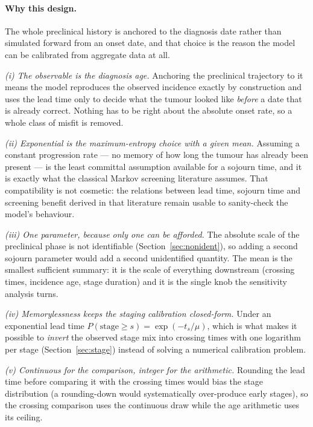 \documentclass[12pt,a4paper]{article}
\newcommand{\why}[1]{\paragraph{Why this design.} #1}
\begin{document}
\why{The whole preclinical history is anchored to the diagnosis date rather than simulated forward from an
onset date, and that choice is the reason the model can be calibrated from aggregate data at all.

\emph{(i) The observable is the diagnosis age.} Anchoring the preclinical trajectory to it means the model
reproduces the observed incidence exactly by construction and uses the lead time only to decide what the
tumour looked like \emph{before} a date that is already correct. Nothing has to be right about the absolute
onset rate, so a whole class of misfit is removed.

\emph{(ii) Exponential is the maximum-entropy choice with a given mean.} Assuming a constant progression
rate --- no memory of how long the tumour has already been present --- is the least committal assumption
available for a sojourn time, and it is exactly what the classical Markov screening literature assumes.
That compatibility is not cosmetic: the relations between lead time, sojourn time and screening benefit
derived in that literature remain usable to sanity-check the model's behaviour.

\emph{(iii) One parameter, because only one can be afforded.} The absolute scale of the preclinical phase
is not identifiable (Section~\ref{sec:nonident}), so adding a second sojourn parameter would add a second
unidentified quantity. The mean is the smallest sufficient summary: it is the scale of everything
downstream (crossing times, incidence age, stage duration) and it is the single knob the sensitivity
analysis turns.

\emph{(iv) Memorylessness keeps the staging calibration closed-form.} Under an exponential lead time
$P(\text{stage} \ge s) = \exp(-t_s/\mu)$, which is what makes it possible to \emph{invert} the observed
stage mix into crossing times with one logarithm per stage (Section~\ref{sec:stage}) instead of solving a
numerical calibration problem.

\emph{(v) Continuous for the comparison, integer for the arithmetic.} Rounding the lead time before
comparing it with the crossing times would bias the stage distribution (a rounding-down would
systematically over-produce early stages), so the crossing comparison uses the continuous draw while the
age arithmetic uses its ceiling.}
\end{document}
